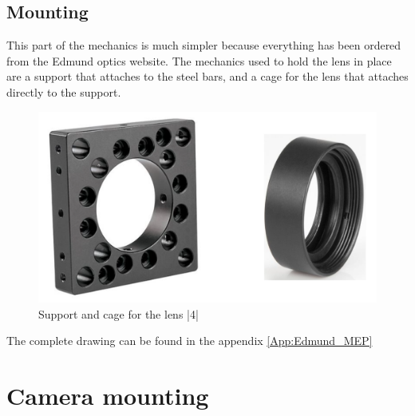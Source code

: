 \subsection{Mounting}
This part of the mechanics is much simpler because everything has been ordered from the Edmund optics website. 
The mechanics used to hold the lens in place are a support that attaches to the steel bars, and a cage for 
the lens that attaches directly to the support.
\begin{figure}[H]
    \centering
    \includegraphics[scale=0.55]{assets/figures/Mechanical Design/Support_Lentille.png}
    \caption{Support and cage for the lens |4|}
    \label{fig:Lentille_Support1}
\end{figure}
\bigbreak
The complete drawing can be found in the appendix \ref{App:Edmund_MEP}
\newpage
\section{Camera mounting}\label{sec:Camera}
